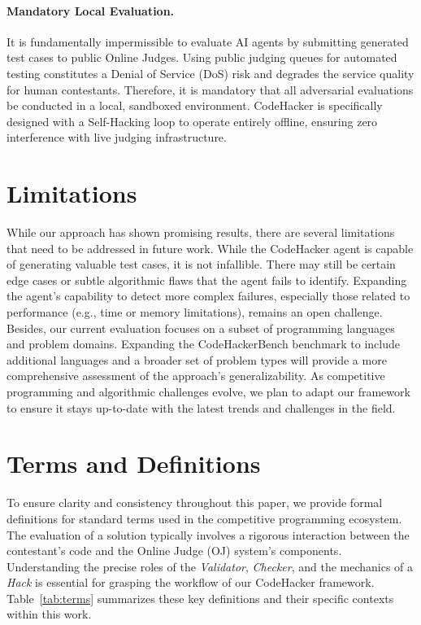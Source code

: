 \documentclass[11pt]{article}
\begin{document}
\paragraph{Mandatory Local Evaluation.}
It is fundamentally impermissible to evaluate AI agents by submitting generated test cases to public Online Judges. Using public judging queues for automated testing constitutes a Denial of Service (DoS) risk and degrades the service quality for human contestants. Therefore, it is mandatory that all adversarial evaluations be conducted in a local, sandboxed environment. CodeHacker is specifically designed with a Self-Hacking loop to operate entirely offline, ensuring zero interference with live judging infrastructure.

\section*{Limitations}
While our approach has shown promising results, there are several limitations that need to be addressed in future work. While the CodeHacker agent is capable of generating valuable test cases, it is not infallible. There may still be certain edge cases or subtle algorithmic flaws that the agent fails to identify. Expanding the agent’s capability to detect more complex failures, especially those related to performance (e.g., time or memory limitations), remains an open challenge.
Besides, our current evaluation focuses on a subset of programming languages and problem domains. Expanding the CodeHackerBench benchmark to include additional languages and a broader set of problem types will provide a more comprehensive assessment of the approach’s generalizability. As competitive programming and algorithmic challenges evolve, we plan to adapt our framework to ensure it stays up-to-date with the latest trends and challenges in the field.



\appendix

\section{Terms and Definitions}
To ensure clarity and consistency throughout this paper, we provide formal definitions for standard terms used in the competitive programming ecosystem. The evaluation of a solution typically involves a rigorous interaction between the contestant's code and the Online Judge (OJ) system's components. Understanding the precise roles of the \textit{Validator}, \textit{Checker}, and the mechanics of a \textit{Hack} is essential for grasping the workflow of our CodeHacker framework. Table~\ref{tab:terms} summarizes these key definitions and their specific contexts within this work.
\newcommand{\cterm}[2]{%
  \shortstack[l]{\textbf{#1}\\\textit{#2}}%
}
\end{document}
